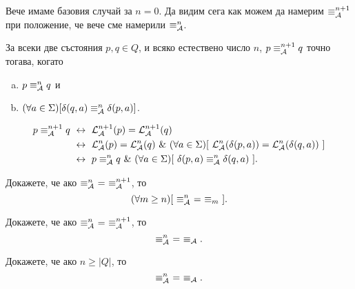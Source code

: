 Вече имаме базовия случай за $n=0$.
Да видим сега как можем да намерим $\equiv^{n+1}_{\mathcal{A}}$ при положение, че вече сме намерили $\equiv^n_{\mathcal{A}}$.
\begin{framed}
  \begin{prop}
    \label{pr:one-letter-test}
    За всеки две състояния $p,q \in Q$, и всяко естествено число $n$, $p \equiv^{n+1}_{\mathcal{A}} q$ точно тогава, когато
    \begin{enumerate}[a)]
    \item
      $p \equiv^n_{\mathcal{A}} q$ и
    \item
      $(\forall a \in \Sigma)[\delta(q,a) \equiv^n_{\mathcal{A}} \delta(p,a)]$.
    \end{enumerate}
  \end{prop}  
\end{framed}
\begin{hint}
  \begin{align*}
    p \equiv^{n+1}_\A q & \iff \L^{n+1}_\A(p) = \L^{n+1}_\A(q)\\
                     & \iff \L^n_\A(p) = \L^n_\A(q)\ \&\ (\forall a \in \Sigma)[\ \L^n_\A(\delta(p,a)) = \L^n_\A(\delta(q,a))\ ]\\
                     & \iff p \equiv^n_\A q\ \&\ (\forall a \in \Sigma)[\ \delta(p,a) \equiv^n_\A \delta(q,a)\ ].
  \end{align*}
\end{hint}

\begin{problem}
  Докажете, че ако $\equiv^n_\A\ =\ \equiv^{n+1}_\A$, то
  \[(\forall m \geq n)[\ \equiv^n_{\mathcal{A}}\ =\ \equiv_m\ ].\]
\end{problem}

\begin{problem}
  Докажете, че ако $\equiv^n_\A\ =\ \equiv^{n+1}_\A$, то
  \[\equiv^n_\A\ =\ \equiv_\A.\]
\end{problem}

\begin{problem}
  Докажете, че ако $n \geq |Q|$, то
  \[\equiv^n_\A\ =\ \equiv_\A.\]
\end{problem}


